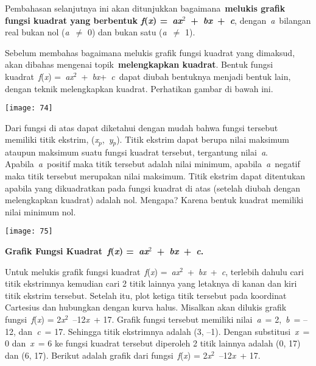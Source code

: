 \documentclass[11pt,fleqn]{book} %
\begin{document}
\begin{myEnumerate}
\begin{itemize}
\noindent \eject 

\noindent Pembahasan selanjutnya ini akan ditunjukkan bagaimana~\textbf{melukis grafik fungsi kuadrat yang berbentuk \textit{f}(\textit{x}) =~\textit{ax}${}^{2}$~+~\textit{bx}~+~\textit{c}}, dengan~\textit{a}~bilangan real bukan nol (\textit{a}~$\mathrm{\neq}$ 0) dan bukan satu (\textit{a}~$\mathrm{\neq}$ 1).

\noindent Sebelum membahas bagaimana melukis grafik fungsi kuadrat yang dimaksud, akan dibahas mengenai topik~\textbf{melengkapkan kuadrat}. Bentuk fungsi kuadrat~\textit{f}(\textit{x}) =~\textit{ax}${}^{2}$~+~\textit{bx}+~\textit{c}~dapat diubah bentuknya menjadi bentuk lain, dengan teknik melengkapkan kuadrat. Perhatikan gambar di bawah ini.

\begin{center}
\noindent \texttt{[image: 74]}\textbf{}
\end{center}

\noindent Dari fungsi di atas dapat diketahui dengan mudah bahwa fungsi tersebut memiliki titik ekstrim, (\textit{x${}_{p}$},~\textit{y${}_{p}$}). Titik ekstrim dapat berupa nilai maksimum ataupun maksimum suatu fungsi kuadrat tersebut, tergantung nilai~\textit{a}. Apabila~\textit{a}~positif maka titik tersebut adalah nilai minimum, apabila~\textit{a}~negatif maka titik tersebut merupakan nilai maksimum. Titik ekstrim dapat ditentukan apabila yang dikuadratkan pada fungsi kuadrat di atas (setelah diubah dengan melengkapkan kuadrat) adalah nol. Mengapa? Karena bentuk kuadrat memiliki nilai minimum nol.

\begin{center}
\noindent \texttt{[image: 75]}\textbf{}
\end{center}

\noindent \textbf{Grafik Fungsi Kuadrat~\textit{f}(\textit{x}) =~\textit{ax}${}^{2}$~+~\textit{bx}~+~\textit{c}.}

\noindent Untuk melukis grafik fungsi kuadrat~\textit{f}(\textit{x}) =~\textit{ax}${}^{2}$~+~\textit{bx}~+~\textit{c}, terlebih dahulu cari titik ekstrimnya kemudian cari 2 titik lainnya yang letaknya di kanan dan kiri titik ekstrim tersebut. Setelah itu, plot ketiga titik tersebut pada koordinat Cartesius dan hubungkan dengan kurva halus. Misalkan akan dilukis grafik fungsi~\textit{f}(\textit{x}) = 2\textit{x}${}^{2}$~--12\textit{x}~+ 17. Grafik fungsi tersebut memiliki nilai~\textit{a}~= 2,~\textit{b}~= -- 12, dan~\textit{c}~= 17. Sehingga titik ekstrimnya adalah (3, --1). Dengan substitusi~\textit{x}~= 0 dan~\textit{x}~= 6 ke fungsi kuadrat tersebut diperoleh 2 titik lainnya adalah (0, 17) dan (6, 17). Berikut adalah grafik dari fungsi~\textit{f}(\textit{x}) = 2\textit{x}${}^{2}$~--12\textit{x}~+ 17.


\end{itemize}
\end{myEnumerate}
\end{document}
